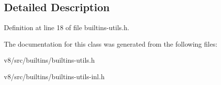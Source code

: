 \subsection{Detailed Description}


Definition at line 18 of file builtins-\/utils.\+h.



The documentation for this class was generated from the following files\+:\begin{DoxyCompactItemize}
\item 
v8/src/builtins/builtins-\/utils.\+h\item 
v8/src/builtins/builtins-\/utils-\/inl.\+h\end{DoxyCompactItemize}
